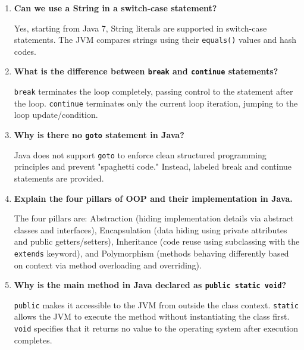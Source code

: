 \documentclass[12pt,a4paper]{article}
\newcommand{\Q}[1]{\textbf{#1}\par\noindent\ignorespaces}
\begin{document}
\begin{tcolorbox}[exambox, title={\textbf{Frequently Asked / Viva Questions}}]
\begin{enumerate}[leftmargin=*, label=\textbf{Q\arabic*.}, itemsep=5pt]
  \item \Q{Can we use a String in a switch-case statement?}
        Yes, starting from Java 7, String literals are supported in switch-case statements. The JVM compares strings using their \texttt{equals()} values and hash codes.
        
  \item \Q{What is the difference between \texttt{break} and \texttt{continue} statements?}
        \texttt{break} terminates the loop completely, passing control to the statement after the loop. \texttt{continue} terminates only the current loop iteration, jumping to the loop update/condition.
        
  \item \Q{Why is there no \texttt{goto} statement in Java?}
        Java does not support \texttt{goto} to enforce clean structured programming principles and prevent "spaghetti code." Instead, labeled break and continue statements are provided.
        
  \item \Q{Explain the four pillars of OOP and their implementation in Java.}
        The four pillars are: Abstraction (hiding implementation details via abstract classes and interfaces), Encapsulation (data hiding using private attributes and public getters/setters), Inheritance (code reuse using subclassing with the \texttt{extends} keyword), and Polymorphism (methods behaving differently based on context via method overloading and overriding).
        
  \item \Q{Why is the main method in Java declared as \texttt{public static void}?}
        \texttt{public} makes it accessible to the JVM from outside the class context. \texttt{static} allows the JVM to execute the method without instantiating the class first. \texttt{void} specifies that it returns no value to the operating system after execution completes.
\end{enumerate}
\end{tcolorbox}
\end{document}
